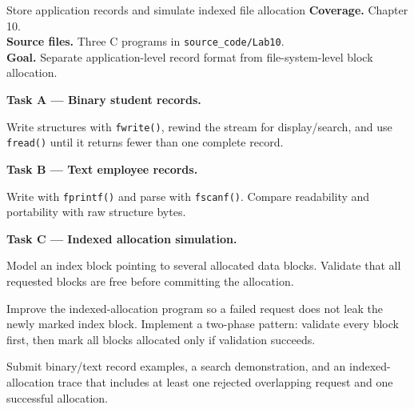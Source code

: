 \begin{labproject}{Store application records and simulate indexed file allocation}
\textbf{Coverage.} Chapter 10.\\
\textbf{Source files.} Three C programs in \texttt{source\_code/Lab10}.\\
\textbf{Goal.} Separate application-level record format from file-system-level block allocation.

\medskip\noindent\textbf{Task A --- Binary student records.}\par
Write structures with \texttt{fwrite()}, rewind the stream for display/search, and use \texttt{fread()} until it returns fewer than one complete record.

\medskip\noindent\textbf{Task B --- Text employee records.}\par
Write with \texttt{fprintf()} and parse with \texttt{fscanf()}. Compare readability and portability with raw structure bytes.

\medskip\noindent\textbf{Task C --- Indexed allocation simulation.}\par
Model an index block pointing to several allocated data blocks. Validate that all requested blocks are free before committing the allocation.

\begin{debugtask}
Improve the indexed-allocation program so a failed request does not leak the newly marked index block. Implement a two-phase pattern: validate every block first, then mark all blocks allocated only if validation succeeds.
\end{debugtask}
\end{labproject}

\begin{labdeliverable}
Submit binary/text record examples, a search demonstration, and an indexed-allocation trace that includes at least one rejected overlapping request and one successful allocation.
\end{labdeliverable}
